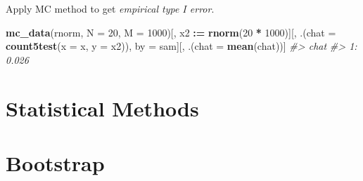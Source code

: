 \documentclass[]{book}
\newenvironment{Shaded}{\begin{snugshade}}{\end{snugshade}}
\newcommand{\CommentTok}[1]{\textcolor[rgb]{0.56,0.35,0.01}{\textit{#1}}}
\newcommand{\DataTypeTok}[1]{\textcolor[rgb]{0.13,0.29,0.53}{#1}}
\newcommand{\DecValTok}[1]{\textcolor[rgb]{0.00,0.00,0.81}{#1}}
\newcommand{\ErrorTok}[1]{\textcolor[rgb]{0.64,0.00,0.00}{\textbf{#1}}}
\newcommand{\KeywordTok}[1]{\textcolor[rgb]{0.13,0.29,0.53}{\textbf{#1}}}
\newcommand{\NormalTok}[1]{#1}
\newcommand{\OperatorTok}[1]{\textcolor[rgb]{0.81,0.36,0.00}{\textbf{#1}}}
\newcommand{\StringTok}[1]{\textcolor[rgb]{0.31,0.60,0.02}{#1}}
\theoremstyle{definition}
\theoremstyle{definition}
\theoremstyle{definition}
\theoremstyle{remark}
\begin{document}
Apply MC method to get \emph{empirical type I error}.

\begin{Shaded}
\begin{Highlighting}[]
\KeywordTok{mc_data}\NormalTok{(rnorm, }\DataTypeTok{N =} \DecValTok{20}\NormalTok{, }\DataTypeTok{M =} \DecValTok{1000}\NormalTok{)[,}
\NormalTok{                                 x2 }\OperatorTok{:}\ErrorTok{=}\StringTok{ }\KeywordTok{rnorm}\NormalTok{(}\DecValTok{20} \OperatorTok{*}\StringTok{ }\DecValTok{1000}\NormalTok{)][,}
\NormalTok{                                                         .(}\DataTypeTok{chat =} \KeywordTok{count5test}\NormalTok{(}\DataTypeTok{x =}\NormalTok{ x, }\DataTypeTok{y =}\NormalTok{ x2)),}
\NormalTok{                                                         by =}\StringTok{ }\NormalTok{sam][,}
\NormalTok{                                                                   .(}\DataTypeTok{chat =} \KeywordTok{mean}\NormalTok{(chat))]}
\CommentTok{#>     chat}
\CommentTok{#> 1: 0.026}
\end{Highlighting}
\end{Shaded}

\hypertarget{statistical-methods}{%
\section{Statistical Methods}\label{statistical-methods}}

\hypertarget{bootstrap}{%
\section{Bootstrap}\label{bootstrap}}


\end{document}
